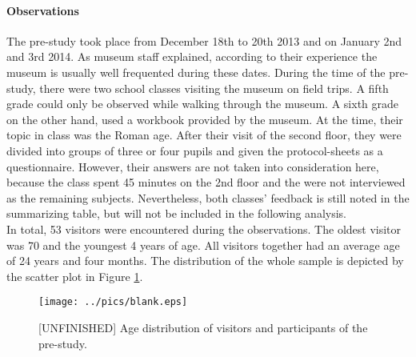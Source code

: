 \paragraph{Observations} The pre-study took place from December 18th to 20th 2013 and on January 2nd and 3rd 2014. As museum staff explained, according to their experience the museum is usually well frequented during these dates. During the time of the pre-study, there were two school classes visiting the museum on field trips. A fifth grade could only be observed while walking through the museum. A sixth grade on the other hand, used a workbook provided by the museum. At the time, their topic in class was the Roman age. After their visit of the second floor, they were divided into groups of three or four pupils and given the protocol-sheets as a questionnaire. However, their answers are not taken into consideration here, because the class spent 45 minutes on the 2nd floor and the were not interviewed as the remaining subjects. Nevertheless, both classes' feedback is still noted in the summarizing table, but will not be included in the following analysis.
\\
In total, 53 visitors were encountered during the observations. The oldest visitor was 70 and the youngest 4 years of age. All visitors together had an average age of 24 years and four months. The distribution of the whole sample is depicted by the scatter plot in Figure \ref{fig:pre-study_ages}. 
\begin{figure}[H]%
\texttt{[image: ../pics/blank.eps]}%
\caption{[UNFINISHED] Age distribution of visitors and participants of the pre-study.}
\label{fig:pre-study_ages} %
\end{figure}

